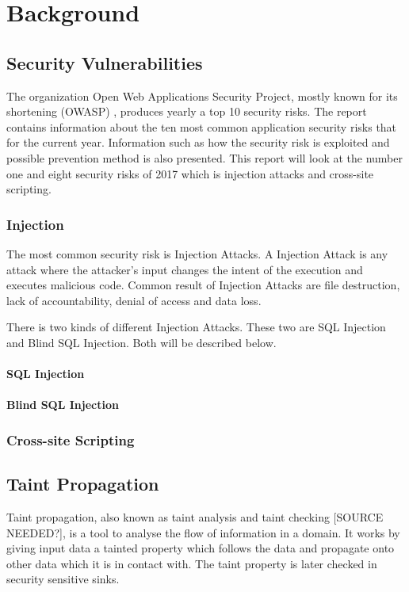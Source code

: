 \chapter{Background}


\section{Security Vulnerabilities}
The organization Open Web Applications Security Project, mostly known for its shortening (OWASP) \parencite{OpenWebApplicationSecurityProject}, produces yearly a top 10 security risks. The report contains information about the ten most common application security risks that for the current year. Information such as how the security risk is exploited and possible prevention method is also presented. \parencite{OWASP2017} This report will look at the number one and eight security risks of 2017 which is injection attacks and cross-site scripting. \parencite{OWASP2017}


\subsection{Injection}
The most common security risk is Injection Attacks. \parencite{OWASP2017} A Injection Attack is any attack where the attacker's input changes the intent of the execution and executes malicious code. Common result of Injection Attacks are file destruction, lack of accountability, denial of access and data loss. \parencite{Secure_Web} 

There is two kinds of different Injection Attacks. These two are SQL Injection and Blind SQL Injection. \parencite{Secure_Web} Both will be described below.


\subsubsection{SQL Injection}


\subsubsection{Blind SQL Injection}


\subsection{Cross-site Scripting}


\section{Taint Propagation}
Taint propagation, also known as taint analysis and taint checking [SOURCE NEEDED?], is a tool to analyse the flow of information in a domain. \parencite{Pan2015} It works by giving input data a tainted property which follows the data and propagate onto other data which it is in contact with. The taint property is later checked in security sensitive sinks. \parencite{Pan2015} 

